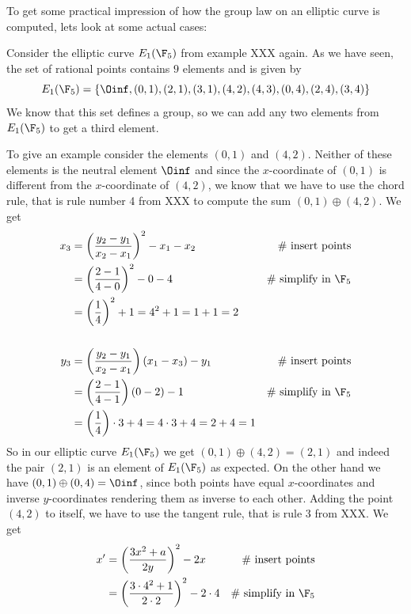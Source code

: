 To get some practical impression of how the group law on an elliptic curve is computed, lets look at some actual cases: 
\begin{example}Consider the elliptic curve $E_1(\F_5)$ from example XXX again.  As we have seen, the set of rational points contains $9$ elements and is given by
$$
E_1(\F_5) = \{\Oinf, (0,1),(2,1),(3,1),(4,2),(4,3),(0,4),(2,4),(3,4)\}
$$
We know that this set defines a group, so we can add any two elements from $E_1(\F_5)$ to get a third element. 

To give an example consider the elements $(0,1)$ and $(4,2)$. Neither of these elements is the neutral element $\Oinf$ and since the $x$-coordinate of $(0,1)$ is different from the $x$-coordinate of $(4,2)$, we know that we have to use the chord rule, that is rule number 4 from XXX to compute the sum $(0,1)\oplus (4,2)$. We get
\begin{align*}
x_3  & = \left(\frac{y_2-y_1}{x_2-x_1}\right)^2 -x_1-x_2 & \text{\# insert points}\\
     & = \left(\frac{2-1}{4-0}\right)^2 -0-4  & \text{\# simplify in } \F_5\\
     & = \left(\frac{1}{4}\right)^2 +1
       = 4^2 +1
       = 1 +1 
       = 2
\\
\\
y_3  & = \left(\frac{y_2-y_1}{x_2-x_1} \right)\left(x_1-x_3\right) - y_1  & \text{\# insert points}\\     
     & = \left(\frac{2-1}{4-1} \right)\left(0-2\right) - 1   & \text{\# simplify in } \F_5\\    
     & = \left(\frac{1}{4} \right)\cdot 3 + 4   
       = 4\cdot 3 + 4
       = 2 + 4
       = 1          
\end{align*} 
So in our elliptic curve $E_1(\F_5)$ we get $(0,1)\oplus (4,2) =(2,1)$ and indeed the pair $(2,1)$ is an element of $E_1(\F_5)$ as expected. On the other hand we have $(0,1)\oplus (0,4) =\Oinf$, since both points have equal $x$-coordinates and inverse $y$-coordinates rendering them as inverse to each other. Adding the point $(4,2)$ to itself, we have to use the tangent rule, that is rule 3 from XXX. We get 
\begin{align*}
x'  & = \left(\frac{3x^2+a}{2y}\right)^2 -2x   & \text{\# insert points}\\
    & = \left(\frac{3\cdot 4^2+1}{2\cdot 2}\right)^2 -2\cdot 4 & \text{\# simplify in } \F_5 \\

\end{align*}
\end{example}
